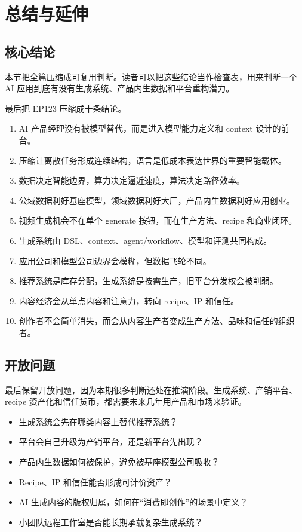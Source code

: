 \section{总结与延伸}

\subsection{核心结论}

本节把全篇压缩成可复用判断。读者可以把这些结论当作检查表，用来判断一个 AI 应用到底有没有生成系统、产品内生数据和平台重构潜力。

最后把 EP123 压缩成十条结论。

\begin{enumerate}
\item AI 产品经理没有被模型替代，而是进入模型能力定义和 context 设计的前台。
\item 压缩让离散任务形成连续结构，语言是低成本表达世界的重要智能载体。
\item 数据决定智能边界，算力决定逼近速度，算法决定路径效率。
\item 公域数据利好基座模型，领域数据利好大厂，产品内生数据利好应用创业。
\item 视频生成机会不在单个 generate 按钮，而在生产方法、recipe 和商业闭环。
\item 生成系统由 DSL、context、agent/workflow、模型和评测共同构成。
\item 应用公司和模型公司边界会模糊，但数据飞轮不同。
\item 推荐系统是库存分配，生成系统是按需生产，旧平台分发权会被削弱。
\item 内容经济会从单点内容和注意力，转向 recipe、IP 和信任。
\item 创作者不会简单消失，而会从内容生产者变成生产方法、品味和信任的组织者。
\end{enumerate}

\subsection{开放问题}

最后保留开放问题，因为本期很多判断还处在推演阶段。生成系统、产销平台、recipe 资产化和信任货币，都需要未来几年用产品和市场来验证。

\begin{itemize}
\item 生成系统会先在哪类内容上替代推荐系统？
\item 平台会自己升级为产销平台，还是新平台先出现？
\item 产品内生数据如何被保护，避免被基座模型公司吸收？
\item Recipe、IP 和信任能否形成可计价资产？
\item AI 生成内容的版权归属，如何在“消费即创作”的场景中定义？
\item 小团队远程工作室是否能长期承载复杂生成系统？
\end{itemize}

